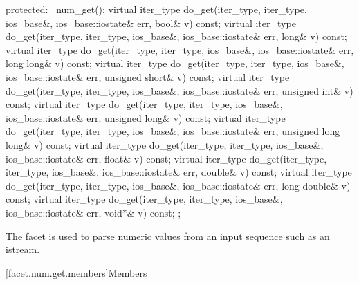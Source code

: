 \begin{codeblock}
{{    protected:
      ~num_get();
      virtual iter_type do_get(iter_type, iter_type, ios_base&,
                               ios_base::iostate& err, bool& v) const;
      virtual iter_type do_get(iter_type, iter_type, ios_base&,
                               ios_base::iostate& err, long& v) const;
      virtual iter_type do_get(iter_type, iter_type, ios_base&,
                               ios_base::iostate& err, long long& v) const;
      virtual iter_type do_get(iter_type, iter_type, ios_base&,
                               ios_base::iostate& err, unsigned short& v) const;
      virtual iter_type do_get(iter_type, iter_type, ios_base&,
                               ios_base::iostate& err, unsigned int& v) const;
      virtual iter_type do_get(iter_type, iter_type, ios_base&,
                               ios_base::iostate& err, unsigned long& v) const;
      virtual iter_type do_get(iter_type, iter_type, ios_base&,
                               ios_base::iostate& err, unsigned long long& v) const;
      virtual iter_type do_get(iter_type, iter_type, ios_base&,
                               ios_base::iostate& err, float& v) const;
      virtual iter_type do_get(iter_type, iter_type, ios_base&,
                               ios_base::iostate& err, double& v) const;
      virtual iter_type do_get(iter_type, iter_type, ios_base&,
                               ios_base::iostate& err, long double& v) const;
      virtual iter_type do_get(iter_type, iter_type, ios_base&,
                               ios_base::iostate& err, void*& v) const;
    };
}
\end{codeblock}

\pnum
The facet
is used to parse numeric values from an input sequence such as an istream.

[facet.num.get.members]{Members}

